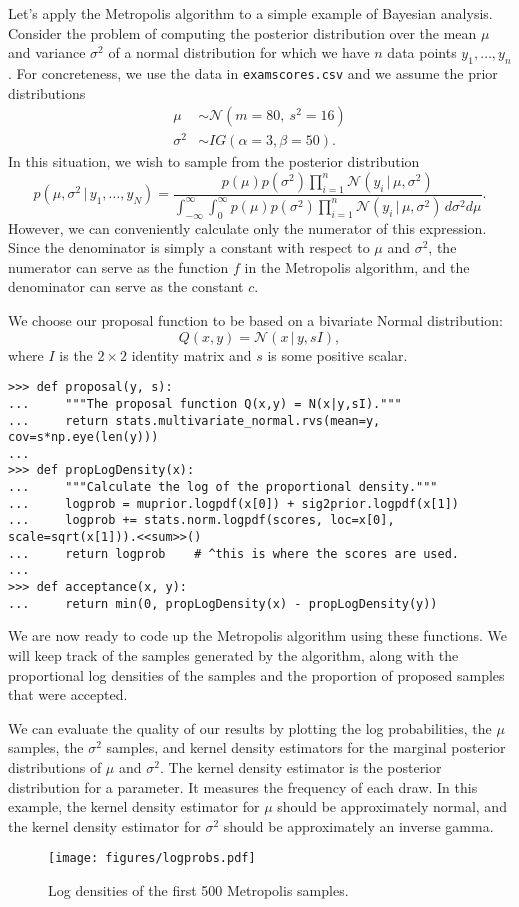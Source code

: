 Let's apply the Metropolis algorithm to a simple example of Bayesian analysis.
Consider the problem of computing the posterior distribution over the mean $\mu$ and variance $\sigma^2$ of a normal distribution for which we have $n$ data points $y_1,\ldots,y_n$.
For concreteness, we use the data in \texttt{examscores.csv} and we assume
the prior distributions
\begin{align*}
\mu &\sim \mathcal{N}(m=80,\ s^2=16)\\
\sigma^2 &\sim IG(\alpha=3,\beta=50).
\end{align*}
In this situation, we wish to sample from the posterior distribution
\[
p(\mu,\sigma^2 \,|\,y_1,\ldots,y_N) = \frac{p(\mu)p(\sigma^2)\prod_{i=1}^n \mathcal{N}(y_i \, | \, \mu, \sigma^2)}
{\int_{-\infty}^\infty\int_{0}^\infty p(\mu)p(\sigma^2)\prod_{i=1}^n \mathcal{N}(y_i \, | \, \mu, \sigma^2)\,d\sigma^2d\mu}.
\]
However, we can conveniently calculate only the numerator of this expression.
Since the denominator is simply a constant with respect to $\mu$ and $\sigma^2$, the numerator can serve as the function $f$ in the Metropolis algorithm, and the denominator can serve as the constant $c$.

We choose our proposal function to be based on a bivariate Normal distribution:
\[
Q(x,y) = \mathcal{N}(x\, | \, y, sI),
\]
where $I$ is the $2\times 2$ identity matrix and $s$ is some positive scalar.
\begin{lstlisting}
>>> def proposal(y, s):
...     """The proposal function Q(x,y) = N(x|y,sI)."""
...     return stats.multivariate_normal.rvs(mean=y, cov=s*np.eye(len(y)))
...
>>> def propLogDensity(x):
...     """Calculate the log of the proportional density."""
...     logprob = muprior.logpdf(x[0]) + sig2prior.logpdf(x[1])
...     logprob += stats.norm.logpdf(scores, loc=x[0], scale=sqrt(x[1])).<<sum>>()
...     return logprob    # ^this is where the scores are used.
...
>>> def acceptance(x, y):
...     return min(0, propLogDensity(x) - propLogDensity(y))
\end{lstlisting}

We are now ready to code up the Metropolis algorithm using these functions.
We will keep track of the samples generated by the algorithm, along with the proportional log densities of the samples and the proportion of proposed samples that were accepted.

We can evaluate the quality of our results by plotting the log probabilities, the $\mu$ samples, the $\sigma^2$ samples, and kernel density estimators for the marginal posterior distributions of $\mu$ and $\sigma^2$. The kernel density estimator is the posterior distribution for a parameter. It measures the frequency of each draw. In this example, the kernel density estimator for $\mu$ should be approximately normal, and the kernel density estimator for $\sigma^2$ should be approximately an inverse gamma.
\begin{figure}[H]
    \centering
    \texttt{[image: figures/logprobs.pdf]}
    \caption{Log densities of the first 500 Metropolis samples.}
    \label{fig:logprobs}
\end{figure}

